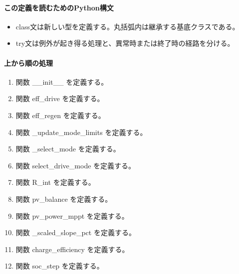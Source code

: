\documentclass[a4paper,11pt]{article}
\begin{document}
            \paragraph{この定義を読むためのPython構文}
            \begin{itemize}[leftmargin=1.6em]
            \item class文は新しい型を定義する。丸括弧内は継承する基底クラスである。
\item try文は例外が起き得る処理と、異常時または終了時の経路を分ける。
            \end{itemize}
            \paragraph{上から順の処理}
            \begin{enumerate}[leftmargin=1.8em]
            \item 関数 \_\_init\_\_ を定義する。
\item 関数 eff\_drive を定義する。
\item 関数 eff\_regen を定義する。
\item 関数 \_update\_mode\_limits を定義する。
\item 関数 \_select\_mode を定義する。
\item 関数 select\_drive\_mode を定義する。
\item 関数 R\_int を定義する。
\item 関数 pv\_balance を定義する。
\item 関数 pv\_power\_mppt を定義する。
\item 関数 \_scaled\_slope\_pct を定義する。
\item 関数 charge\_efficiency を定義する。
\item 関数 soc\_step を定義する。
            \end{enumerate}
\end{document}
